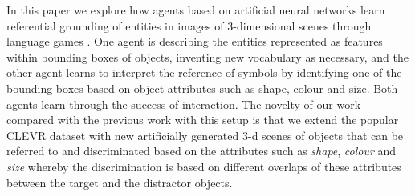 \documentclass[11pt]{article}
\begin{document}

In this paper we explore how agents based on artificial neural networks learn referential grounding of entities in images of 3-dimensional scenes through language games \citep{Clark:1996aa,Bartlett:2005aa,Kirby:2008ab,SteelsLoetzsch:2009,Zaslavsky:2018aa}. %
One agent is describing the entities represented as features within bounding boxes of objects, inventing new vocabulary as necessary, and the other agent learns to interpret the reference of symbols by identifying %
one of the bounding boxes based on object attributes such as shape, colour and size.
Both agents learn through the success of interaction.
The novelty of our work compared with the previous work with this setup \citep{Kharitonov2019,Lazaridou2016} is that we extend the popular CLEVR dataset \citep{Johnson2016} with new artificially generated 3-d scenes of objects that can be referred to and discriminated based on the attributes such as \emph{shape}, \emph{colour} and \emph{size} whereby the discrimination is based on different overlaps of these attributes between the target and the distractor objects. %
\end{document}

